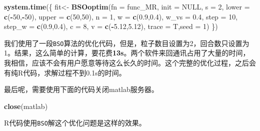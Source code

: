 \documentclass[]{ctexbook}
\newenvironment{Shaded}{\begin{snugshade}}{\end{snugshade}}
\newcommand{\KeywordTok}[1]{\textcolor[rgb]{0.13,0.29,0.53}{\textbf{#1}}}
\newcommand{\DataTypeTok}[1]{\textcolor[rgb]{0.13,0.29,0.53}{#1}}
\newcommand{\DecValTok}[1]{\textcolor[rgb]{0.00,0.00,0.81}{#1}}
\newcommand{\FloatTok}[1]{\textcolor[rgb]{0.00,0.00,0.81}{#1}}
\newcommand{\StringTok}[1]{\textcolor[rgb]{0.31,0.60,0.02}{#1}}
\newcommand{\OtherTok}[1]{\textcolor[rgb]{0.56,0.35,0.01}{#1}}
\newcommand{\OperatorTok}[1]{\textcolor[rgb]{0.81,0.36,0.00}{\textbf{#1}}}
\newcommand{\NormalTok}[1]{#1}
\begin{document}
\begin{Shaded}
\begin{Highlighting}[]
\KeywordTok{system.time}\NormalTok{(\{}
\NormalTok{  fit<-}
\StringTok{    }\KeywordTok{BSOoptim}\NormalTok{(}\DataTypeTok{fn =}\NormalTok{ func_MR,}
             \DataTypeTok{init =} \OtherTok{NULL}\NormalTok{,}
             \DataTypeTok{s =} \DecValTok{2}\NormalTok{,}
             \DataTypeTok{lower =} \KeywordTok{c}\NormalTok{(}\OperatorTok{-}\DecValTok{50}\NormalTok{,}\OperatorTok{-}\DecValTok{50}\NormalTok{),}
             \DataTypeTok{upper =} \KeywordTok{c}\NormalTok{(}\DecValTok{50}\NormalTok{,}\DecValTok{50}\NormalTok{),}
             \DataTypeTok{n =} \DecValTok{1}\NormalTok{,}
             \DataTypeTok{w =} \KeywordTok{c}\NormalTok{(}\FloatTok{0.9}\NormalTok{,}\FloatTok{0.4}\NormalTok{),}
             \DataTypeTok{w_vs =} \FloatTok{0.4}\NormalTok{, }
             \DataTypeTok{step =} \DecValTok{10}\NormalTok{,}
             \DataTypeTok{step_w =} \KeywordTok{c}\NormalTok{(}\FloatTok{0.9}\NormalTok{,}\FloatTok{0.4}\NormalTok{),}
             \DataTypeTok{c =} \DecValTok{8}\NormalTok{,}
             \DataTypeTok{v =} \KeywordTok{c}\NormalTok{(}\OperatorTok{-}\FloatTok{5.12}\NormalTok{,}\FloatTok{5.12}\NormalTok{),}
             \DataTypeTok{trace =}\NormalTok{ T,}\DataTypeTok{seed =} \DecValTok{1}\NormalTok{)}
\NormalTok{\}) }
\end{Highlighting}
\end{Shaded}

我们使用了一段\texttt{BSO}算法的优化代码，但是，粒子数目设置为2，回合数只设置为1。结果，这么简单的计算，要花费\textbf{13s}。两个软件来回通讯占用了大量的时间，我相信，应该不会有用户愿意等待这么长久的时间。这个完整的优化过程，之后会有纯R代码，求解过程不到0.1s的时间。

最后呢，需要使用下面的代码关闭matlab服务器。

\begin{Shaded}
\begin{Highlighting}[]
\KeywordTok{close}\NormalTok{(matlab)}
\end{Highlighting}
\end{Shaded}

R代码使用\texttt{BSO}解这个优化问题是这样的效果。
\end{document}
